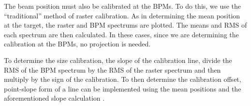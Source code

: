 The beam position must also be calibrated at the BPMs. To do this, we use the ``traditional'' method of raster calibration. As in determining the mean position at the target, the raster and BPM spectrums are plotted. The means and RMS of each spectrum are then calculated. In these cases, since we are determining the calibration at the BPMs, no projection is needed.

To determine the size calibration, the slope of the calibration line, divide the RMS of the BPM spectrum by the RMS of the raster spectrum and then multiply by the sign of the calibration. To then determine the calibration offset, point-slope form of a line can be implemented using the mean positions and the aforementioned slope calculation \cite{Barak}.